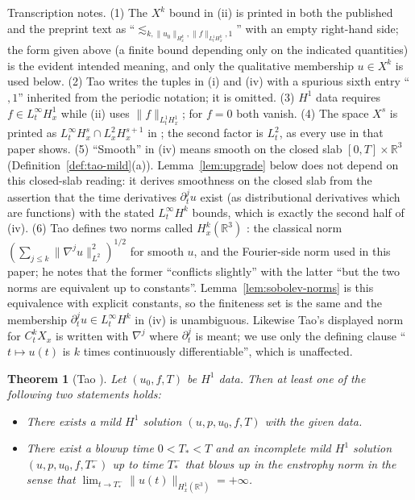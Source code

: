 \documentclass[11pt]{article}
\newtheorem{theorem}{Theorem}[section]
\theoremstyle{definition}
\theoremstyle{plain}
\newcommand{\R}{\mathbb R}
\newcommand{\norm}[1]{\lVert #1\rVert}
\begin{document}
Transcription notes.  (1) The $X^k$ bound in (ii) is printed in both the
published and the preprint text as ``$\lesssim_{k,\norm{u_0}_{H^k_x},
\norm f_{L^1_tH^k_x},1}$'' with an empty right-hand side; the form given
above (a finite bound depending only on the indicated quantities) is the
evident intended meaning, and only the qualitative membership $u\in X^k$
is used below.  (2) Tao writes the tuples in (i) and (iv) with a spurious
sixth entry ``$,1$'' inherited from the periodic notation; it is omitted.
(3) $H^1$ data requires $f\in L^\infty_tH^1_x$ while (ii) uses
$\norm f_{L^1_tH^1_x}$; for $f=0$ both vanish.  (4) The space $X^s$ is
printed as $L^\infty_tH^s_x\cap L^2_xH^{s+1}_x$ in \cite[(13), p.~37]{Tao2013};
the second factor is $L^2_t$, as every use in that paper shows.
(5) ``Smooth'' in (iv) means smooth on the closed slab $[0,T]\times\R^3$
(Definition~\ref{def:tao-mild}(a)).  Lemma~\ref{lem:upgrade} below does
not depend on this closed-slab reading: it derives smoothness on the
closed slab from the assertion that the time derivatives $\partial_t^ju$
exist (as distributional derivatives which are functions) with the stated
$L^\infty_tH^k$ bounds, which is exactly the second half of (iv).
(6) Tao defines two norms called $H^k_x(\R^3)$ \cite[p.~36]{Tao2013}: the
classical norm $(\sum_{j\leq k}\norm{\nabla^ju}_{L^2}^2)^{1/2}$ for smooth
$u$, and the Fourier-side norm used in this paper; he notes that the
former ``conflicts slightly'' with the latter ``but the two norms are
equivalent up to constants''.  Lemma~\ref{lem:sobolev-norms} is this
equivalence with explicit constants, so the finiteness set is the same and
the membership $\partial_t^ju\in L^\infty_tH^k$ in (iv) is unambiguous.
Likewise Tao's displayed norm for $C^k_tX_x$ \cite[p.~37]{Tao2013} is
written with $\nabla^j$ where $\partial_t^j$ is meant; we use only the
defining clause ``$t\mapsto u(t)$ is $k$ times continuously
differentiable'', which is unaffected.

\begin{theorem}[Tao {\cite[Corollary~5.8, p.~56]{Tao2013}}]
\label{thm:tao58}
Let $(u_0,f,T)$ be $H^1$ data.  Then at least one of the following two
statements holds:
\begin{itemize}
\item There exists a mild $H^1$ solution $(u,p,u_0,f,T)$ with the given
data.
\item There exist a blowup time $0<T_*<T$ and an incomplete mild $H^1$
solution $(u,p,u_0,f,T_*^-)$ up to time $T_*^-$ that blows up in the
enstrophy norm in the sense that
$\lim_{t\to T_*^-}\norm{u(t)}_{H^1_x(\R^3)}=+\infty$.
\end{itemize}
\end{theorem}
\end{document}
